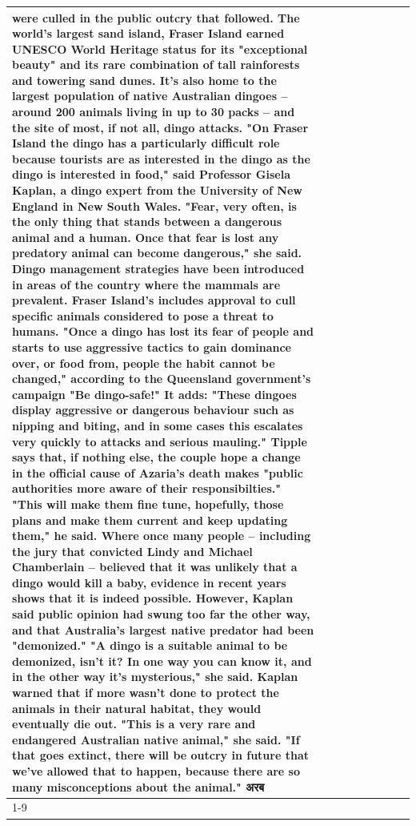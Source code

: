 \begin{table}[H]
\begin{tabular}{lllrlllll}
were culled in the public outcry that followed. The world's largest sand island, Fraser Island earned UNESCO World Heritage status for its "exceptional beauty" and its rare combination of tall rainforests and towering sand dunes. It's also home to the largest population of native Australian dingoes -- around 200 animals living in up to 30 packs -- and the site of most, if not all, dingo attacks. "On Fraser Island the dingo has a particularly difficult role because tourists are as interested in the dingo as the dingo is interested in food," said Professor Gisela Kaplan, a dingo expert from the University of New England in New South Wales. "Fear, very often, is the only thing that stands between a dangerous animal and a human. Once that fear is lost any predatory animal can become dangerous," she said. Dingo management strategies have been introduced in areas of the country where the mammals are prevalent. Fraser Island's includes approval to cull specific animals considered to pose a threat to humans. "Once a dingo has lost its fear of people and starts to use aggressive tactics to gain dominance over, or food from, people the habit cannot be changed," according to the Queensland government's campaign "Be dingo-safe!" It adds: "These dingoes display aggressive or dangerous behaviour such as nipping and biting, and in some cases this escalates very quickly to attacks and serious mauling." Tipple says that, if nothing else, the couple hope a change in the official cause of Azaria's death makes "public authorities more aware of their responsibilties." "This will make them fine tune, hopefully, those plans and make them current and keep updating them," he said. Where once many people -- including the jury that convicted Lindy and Michael Chamberlain -- believed that it was unlikely that a dingo would kill a baby, evidence in recent years shows that it is indeed possible. However, Kaplan said public opinion had swung too far the other way, and that Australia's largest native predator had been "demonized." "A dingo is a suitable animal to be demonized, isn't it? In one way you can know it, and in the other way it's mysterious," she said. Kaplan warned that if more wasn't done to protect the animals in their natural habitat, they would eventually die out. "This is a very rare and endangered Australian native animal," she said. "If that goes extinct, there will be outcry in future that we've allowed that to happen, because there are so many misconceptions about the animal." अरब \\
\cline{1-9}

\end{tabular}
\end{table}
